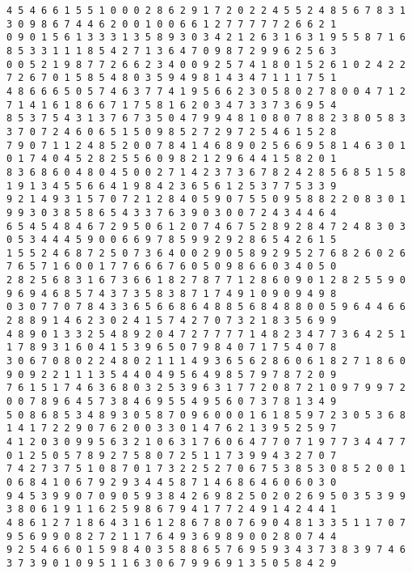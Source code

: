 \begin{verbatim}
4 5 4 6 6 1 5 5 1 0 0 0 2 8 6 2 9 1 7 2 0 2 2 4 5 5 2 4 8 5 6 7 8 3 1 3 0 9 8 6 7 4 4 6 2 0 0 1 0 0 6 6 1 2 7 7 7 7 7 2 6 6 2 1
0 9 0 1 5 6 1 3 3 3 1 3 5 8 9 3 0 3 4 2 1 2 6 3 1 6 3 1 9 5 5 8 7 1 6 8 5 3 3 1 1 1 8 5 4 2 7 1 3 6 4 7 0 9 8 7 2 9 9 6 2 5 6 3
0 0 5 2 1 9 8 7 7 2 6 6 2 3 4 0 0 9 2 5 7 4 1 8 0 1 5 2 6 1 0 2 4 2 2 7 2 6 7 0 1 5 8 5 4 8 0 3 5 9 4 9 8 1 4 3 4 7 1 1 1 7 5 1
4 8 6 6 6 5 0 5 7 4 6 3 7 7 4 1 9 5 6 6 2 3 0 5 8 0 2 7 8 0 0 4 7 1 2 7 1 4 1 6 1 8 6 6 7 1 7 5 8 1 6 2 0 3 4 7 3 3 7 3 6 9 5 4
8 5 3 7 5 4 3 1 3 7 6 7 3 5 0 4 7 9 9 4 8 1 0 8 0 7 8 8 2 3 8 0 5 8 3 3 7 0 7 2 4 6 0 6 5 1 5 0 9 8 5 2 7 2 9 7 2 5 4 6 1 5 2 8
7 9 0 7 1 1 2 4 8 5 2 0 0 7 8 4 1 4 6 8 9 0 2 5 6 6 9 5 8 1 4 6 3 0 1 0 1 7 4 0 4 5 2 8 2 5 5 6 0 9 8 2 1 2 9 6 4 4 1 5 8 2 0 1
8 3 6 8 6 0 4 8 0 4 5 0 0 2 7 1 4 2 3 7 3 6 7 8 2 4 2 8 5 6 8 5 1 5 8 1 9 1 3 4 5 5 6 6 4 1 9 8 4 2 3 6 5 6 1 2 5 3 7 7 5 3 3 9
9 2 1 4 9 3 1 5 7 0 7 2 1 2 8 4 0 5 9 0 7 5 5 0 9 5 8 8 2 2 0 8 3 0 1 9 9 3 0 3 8 5 8 6 5 4 3 3 7 6 3 9 0 3 0 0 7 2 4 3 4 4 6 4
6 5 4 5 4 8 4 6 7 2 9 5 0 6 1 2 0 7 4 6 7 5 2 8 9 2 8 4 7 2 4 8 3 0 3 0 5 3 4 4 4 5 9 0 0 6 6 9 7 8 5 9 9 2 9 2 8 6 5 4 2 6 1 5
1 5 5 2 4 6 8 7 2 5 0 7 3 6 4 0 0 2 9 0 5 8 9 2 9 5 2 7 6 8 2 6 0 2 6 7 6 5 7 1 6 0 0 1 7 7 6 6 6 7 6 0 5 0 9 8 6 6 0 3 4 0 5 0
2 8 2 5 6 8 3 1 6 7 3 6 6 1 8 2 7 8 7 7 1 2 8 6 0 9 0 1 2 8 2 5 5 9 0 9 6 9 4 6 8 5 7 4 3 7 3 5 8 3 8 7 1 7 4 9 1 0 9 0 9 4 9 8
0 3 0 7 7 0 7 8 4 3 3 6 5 6 6 8 6 4 8 8 5 6 8 4 8 8 0 0 5 9 6 4 4 6 6 2 8 8 9 1 4 6 2 3 0 2 4 1 5 7 4 2 7 0 7 3 2 1 8 3 5 6 9 9
4 8 9 0 1 3 3 2 5 4 8 9 2 0 4 7 2 7 7 7 7 1 4 8 2 3 4 7 7 3 6 4 2 5 1 1 7 8 9 3 1 6 0 4 1 5 3 9 6 5 0 7 9 8 4 0 7 1 7 5 4 0 7 8
3 0 6 7 0 8 0 2 2 4 8 0 2 1 1 1 4 9 3 6 5 6 2 8 6 0 6 1 8 2 7 1 8 6 0 9 0 9 2 2 1 1 1 3 5 4 4 0 4 9 5 6 4 9 8 5 7 9 7 8 7 2 0 9
7 6 1 5 1 7 4 6 3 6 8 0 3 2 5 3 9 6 3 1 7 7 2 0 8 7 2 1 0 9 7 9 9 7 2 0 0 7 8 9 6 4 5 7 3 8 4 6 9 5 5 4 9 5 6 0 7 3 7 8 1 3 4 9
5 0 8 6 8 5 3 4 8 9 3 0 5 8 7 0 9 6 0 0 0 1 6 1 8 5 9 7 2 3 0 5 3 6 8 1 4 1 7 2 2 9 0 7 6 2 0 0 3 3 0 1 4 7 6 2 1 3 9 5 2 5 9 7
4 1 2 0 3 0 9 9 5 6 3 2 1 0 6 3 1 7 6 0 6 4 7 7 0 7 1 9 7 7 3 4 4 7 7 0 1 2 5 0 5 7 8 9 2 7 5 8 0 7 2 5 1 1 7 3 9 9 4 3 2 7 0 7
7 4 2 7 3 7 5 1 0 8 7 0 1 7 3 2 2 5 2 7 0 6 7 5 3 8 5 3 0 8 5 2 0 0 1 0 6 8 4 1 0 6 7 9 2 9 3 4 4 5 8 7 1 4 6 8 6 4 6 0 6 0 3 0
9 4 5 3 9 9 0 7 0 9 0 5 9 3 8 4 2 6 9 8 2 5 0 2 0 2 6 9 5 0 3 5 3 9 9 3 8 0 6 1 9 1 1 6 2 5 9 8 6 7 9 4 1 7 7 2 4 9 1 4 2 4 4 1
4 8 6 1 2 7 1 8 6 4 3 1 6 1 2 8 6 7 8 0 7 6 9 0 4 8 1 3 3 5 1 1 7 0 7 9 5 6 9 9 0 8 2 7 2 1 1 7 6 4 9 3 6 9 8 9 0 0 2 8 0 7 4 4
9 2 5 4 6 6 0 1 5 9 8 4 0 3 5 8 8 6 5 7 6 9 5 9 3 4 3 7 3 8 3 9 7 4 6 3 7 3 9 0 1 0 9 5 1 1 6 3 0 6 7 9 9 6 9 1 3 5 0 5 8 4 2 9

\end{verbatim}
